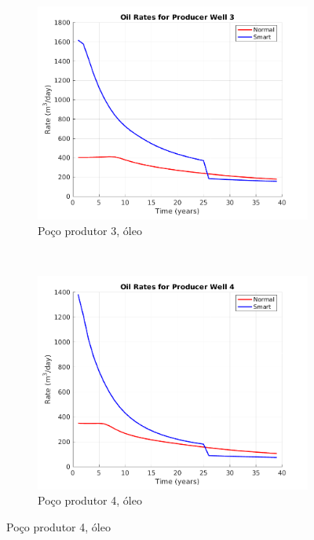 \begin{figure}[!ht]
	\begin{subfigure}[b]{.45\textwidth}
		\includegraphics[width=\textwidth]{figs/resultadosLSAIGUP/LSAIGUP_OilWell3_Zoom}
		\caption{Po\c{c}o produtor 3, \'{o}leo}
		\label{LSAIGUP_OilWell3}
	\end{subfigure}
	~
	\begin{subfigure}[b]{.45\textwidth}
		\includegraphics[width=\textwidth]{figs/resultadosLSAIGUP/LSAIGUP_OilWell4_Zoom}
		\caption{Po\c{c}o produtor 4, \'{o}leo}
		\label{LSAIGUP_OilWell4}
	\end{subfigure}
	

\end{figure}
